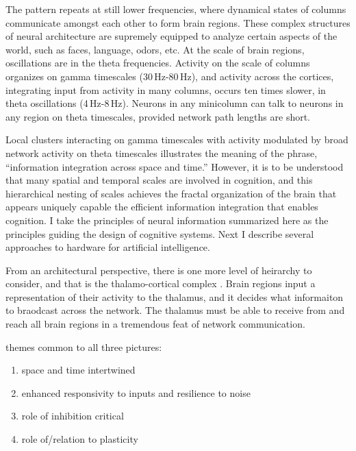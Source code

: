 The pattern repeats at still lower frequencies, where dynamical states of columns communicate amongst each other to form brain regions. These complex structures of neural architecture are supremely equipped to analyze certain aspects of the world, such as faces, language, odors, etc. At the scale of brain regions, oscillations are in the theta frequencies. Activity on the scale of columns organizes on gamma timescales (30\,Hz-80\,Hz), and activity across the cortices, integrating input from activity in many columns, occurs ten times slower, in theta oscillations (4\,Hz-8\,Hz). Neurons in any minicolumn can talk to neurons in any region on theta timescales, provided network path lengths are short. 

Local clusters interacting on gamma timescales with activity modulated by broad network activity on theta timescales illustrates the meaning of the phrase, ``information integration across space and time.'' However, it is to be understood that many spatial and temporal scales are involved in cognition, and this hierarchical nesting of scales achieves the fractal organization of the brain that appears uniquely capable the efficient information integration that enables cognition. I take the principles of neural information summarized here as the principles guiding the design of cognitive systems. Next I describe several approaches to hardware for artificial intelligence.

\vspace{3em}
From an architectural perspective, there is one more level of heirarchy to consider, and that is the thalamo-cortical complex \cite{}. Brain regions input a representation of their activity to the thalamus, and it decides what informaiton to braodcast across the network. The thalamus must be able to receive from and reach all brain regions in a tremendous feat of network communication.

\vspace{3em}
themes common to all three pictures:
\begin{enumerate}
\item space and time intertwined
\item enhanced responsivity to inputs and resilience to noise
\item role of inhibition critical
\item role of/relation to plasticity
\end{enumerate}